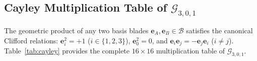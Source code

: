\documentclass[10pt]{article}
\begin{document}
\subsection{Cayley Multiplication Table of \texorpdfstring{$\mathcal{G}_{3,0,1}$}{G(3,0,1)}}

The geometric product of any two basis blades $\mathbf{e}_A, \mathbf{e}_B \in \mathcal{B}$ satisfies the canonical Clifford relations: $\mathbf{e}_i^2 = +1$ ($i \in \{1,2,3\}$), $\mathbf{e}_0^2 = 0$, and $\mathbf{e}_i \mathbf{e}_j = -\mathbf{e}_j \mathbf{e}_i$ ($i \neq j$). 
Table~\ref{tab:cayley} provides the complete $16 \times 16$ multiplication table of $\mathcal{G}_{3,0,1}$.

\begin{table}[!ht]
\centering
\caption{Complete Cayley multiplication table for 3D Plane-based Projective Geometric Algebra $\mathcal{G}_{3,0,1}$. Row entries multiply column entries from the left ($\mathbf{e}_{\text{row}} \mathbf{e}_{\text{col}}$).}
\label{tab:cayley}
\end{table}
\end{document}
